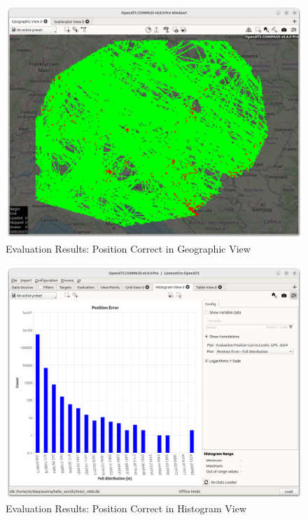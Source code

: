 \begin{figure}[H]
  \hspace*{-2.5cm}
    \includegraphics[width=19cm]{figures/geo_eval_pos_correct.png}
  \caption{Evaluation Results: Position Correct in Geographic View}
\end{figure}

\begin{figure}[H]
  \hspace*{-2.5cm}
    \includegraphics[width=19cm]{figures/histogram_eval_pos_correct.png}
  \caption{Evaluation Results: Position Correct in Histogram View}
\end{figure}



